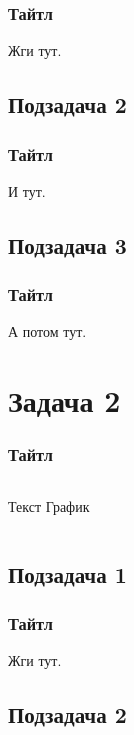 \documentclass[10pt,pdf,aspectratio=169]{beamer}
\begin{document}
\begin{frame}
  \frametitle{Тайтл}   %
  Жги тут.
\end{frame}

\subsection{Подзадача 2}

\begin{frame}
  \frametitle{Тайтл}   %
  И тут.
\end{frame}


\subsection{Подзадача 3}

\begin{frame}
  \frametitle{Тайтл}   %
  А потом тут.
\end{frame}


\section{Задача 2}

\begin{frame}
  \frametitle{Тайтл}   %
  \begin{columns}[c]
  \column{2in}  %
    Текст
  \column{3in}
  График
  \end{columns}
\end{frame}

\subsection{Подзадача 1}

\begin{frame}
  \frametitle{Тайтл}   %
  Жги тут.
\end{frame}

\subsection{Подзадача 2}
\end{document}
